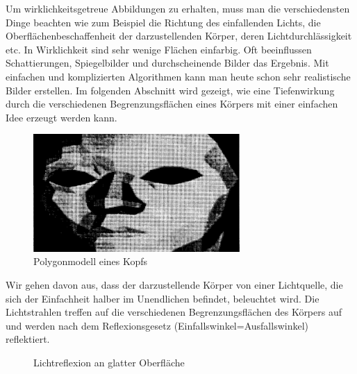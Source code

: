 \documentclass[%
11pt,%
twoside,%
titlepage,%
german,%
headsepline%
]{scrartcl}
\theoremstyle{definition}
\theoremstyle{plain}
\begin{document}
Um wirklichkeitsgetreue Abbildungen zu erhalten, muss man die verschiedensten Dinge beachten wie zum Beispiel die Richtung des einfallenden Lichts, die Ober\-flä\-chen\-be\-schaf\-fen\-heit der darzustellenden Körper, deren Licht\-durch\-läs\-sig\-keit etc. In Wirklichkeit sind sehr wenige Flächen einfarbig. Oft beeinflussen Schattierungen, Spiegelbilder und durchscheinende Bilder das Ergebnis. Mit einfachen und komplizierten Algorithmen kann man heute schon sehr realistische Bilder erstellen. Im folgenden Abschnitt wird gezeigt, wie eine Tiefenwirkung durch die verschiedenen Be\-gren\-zungs\-flächen eines Körpers mit einer einfachen Idee erzeugt werden kann.

\begin{figure}
\begin{center}
\includegraphics[width=0.7\textwidth]{pictures/pcgrafik}
\end{center}
\caption{Polygonmodell eines Kopfs}
\end{figure}

Wir gehen davon aus, dass der darzustellende Körper von einer Lichtquelle, die sich der Einfachheit halber im Unendlichen befindet, beleuchtet wird. Die Lichtstrahlen treffen auf die verschiedenen Begrenzungsflächen des Körpers auf und werden nach dem Reflexionsgesetz (Einfallswinkel=Ausfallswinkel) reflektiert.

\begin{figure}
\begin{center}
\end{center}
\caption{Lichtreflexion an glatter Oberfläche}
\end{figure}
\end{document}
